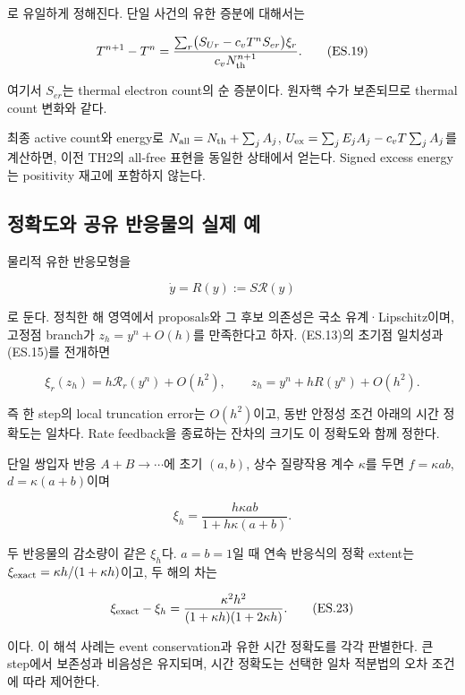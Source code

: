 로 유일하게 정해진다. 단일 사건의 유한 증분에 대해서는

\[
T^{n+1}-T^n
=
\frac{\sum_r
\bigl(S_{Ur}-c_vT^nS_{er}\bigr)\xi_r}
{c_vN_{\rm th}^{n+1}}.
\tag{ES.19}
\]

여기서 \(S_{er}\)는 thermal electron count의 순 증분이다. 원자핵 수가 보존되므로 thermal count 변화와 같다.

최종 active count와 energy로 \(N_{\rm all}=N_{\rm th}+\sum_jA_j\), \(U_{\rm ex}=\sum_jE_jA_j-c_vT\sum_jA_j\)를 계산하면, 이전 TH2의 all-free 표현을 동일한 상태에서 얻는다. Signed excess energy는 positivity 재고에 포함하지 않는다.

\hypertarget{uxc815uxd655uxb3c4uxc640-uxacf5uxc720-uxbc18uxc751uxbb3cuxc758-uxc2e4uxc81c-uxc608}{%
\subsection{정확도와 공유 반응물의 실제 예}\label{uxc815uxd655uxb3c4uxc640-uxacf5uxc720-uxbc18uxc751uxbb3cuxc758-uxc2e4uxc81c-uxc608}}

물리적 유한 반응모형을

\[
\dot y=R(y):=S\mathcal R(y)
\tag{ES.20}
\]

로 둔다. 정칙한 해 영역에서 proposals와 그 후보 의존성은 국소 유계·Lipschitz이며, 고정점 branch가 \(z_h=y^n+O(h)\)를 만족한다고 하자. (ES.13)의 초기점 일치성과 (ES.15)를 전개하면

\[
\xi_r(z_h)=h\mathcal R_r(y^n)+O(h^2),\qquad
z_h=y^n+hR(y^n)+O(h^2).
\tag{ES.21}
\]

즉 한 step의 local truncation error는 \(O(h^2)\)이고, 동반 안정성 조건 아래의 시간 정확도는 일차다. Rate feedback을 종료하는 잔차의 크기도 이 정확도와 함께 정한다.

단일 쌍입자 반응 \(A+B\to\cdots\)에 초기 \((a,b)\), 상수 질량작용 계수 \(\kappa\)를 두면 \(f=\kappa ab\), \(d=\kappa(a+b)\)이며

\[
\xi_h=\frac{h\kappa ab}{1+h\kappa(a+b)}.
\tag{ES.22}
\]

두 반응물의 감소량이 같은 \(\xi_h\)다. \(a=b=1\)일 때 연속 반응식의 정확 extent는 \(\xi_{\rm exact}=\kappa h/(1+\kappa h)\)이고, 두 해의 차는

\[
\xi_{\rm exact}-\xi_h
=
\frac{\kappa^2h^2}
{(1+\kappa h)(1+2\kappa h)}.
\tag{ES.23}
\]

이다. 이 해석 사례는 event conservation과 유한 시간 정확도를 각각 판별한다. 큰 step에서 보존성과 비음성은 유지되며, 시간 정확도는 선택한 일차 적분법의 오차 조건에 따라 제어한다.

